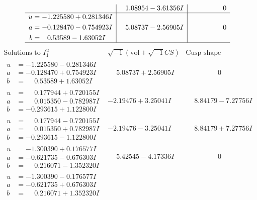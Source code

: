 \documentclass[1p]{elsarticle_modified}
\theoremstyle{definition}
\newcommand{\I}{\sqrt{-1}}
\begin{document}
$$\begin{array}{c|c|c}
 & \phantom{-}1.08954 - 3.61356 I & \phantom{-0.000000 } 0 \\ \hline\begin{aligned}
u &= -1.225580 + 0.281346 I \\
a &= -0.128470 - 0.754923 I \\
b &= \phantom{-}0.53589 - 1.63052 I\end{aligned}
 & \phantom{-}5.08737 - 2.56905 I & \phantom{-0.000000 } 0\\
 \hline 
 \end{array}$$\newpage$$\begin{array}{c|c|c}  
\text{Solutions to }I^u_{1}& \I (\text{vol} + \sqrt{-1}CS) & \text{Cusp shape}\\
 \hline 
\begin{aligned}
u &= -1.225580 - 0.281346 I \\
a &= -0.128470 + 0.754923 I \\
b &= \phantom{-}0.53589 + 1.63052 I\end{aligned}
 & \phantom{-}5.08737 + 2.56905 I & \phantom{-0.000000 } 0 \\ \hline\begin{aligned}
u &= \phantom{-}0.177944 + 0.720155 I \\
a &= \phantom{-}0.015350 - 0.782987 I \\
b &= -0.293615 + 1.122800 I\end{aligned}
 & -2.19476 + 3.25041 I & \phantom{-}8.84179 - 7.27756 I \\ \hline\begin{aligned}
u &= \phantom{-}0.177944 - 0.720155 I \\
a &= \phantom{-}0.015350 + 0.782987 I \\
b &= -0.293615 - 1.122800 I\end{aligned}
 & -2.19476 - 3.25041 I & \phantom{-}8.84179 + 7.27756 I \\ \hline\begin{aligned}
u &= -1.300390 + 0.176577 I \\
a &= -0.621735 - 0.676303 I \\
b &= \phantom{-}0.216071 - 1.352320 I\end{aligned}
 & \phantom{-}5.42545 - 4.17336 I & \phantom{-0.000000 } 0 \\ \hline\begin{aligned}
u &= -1.300390 - 0.176577 I \\
a &= -0.621735 + 0.676303 I \\
b &= \phantom{-}0.216071 + 1.352320 I\end{aligned}

\end{array}$$
\end{document}
